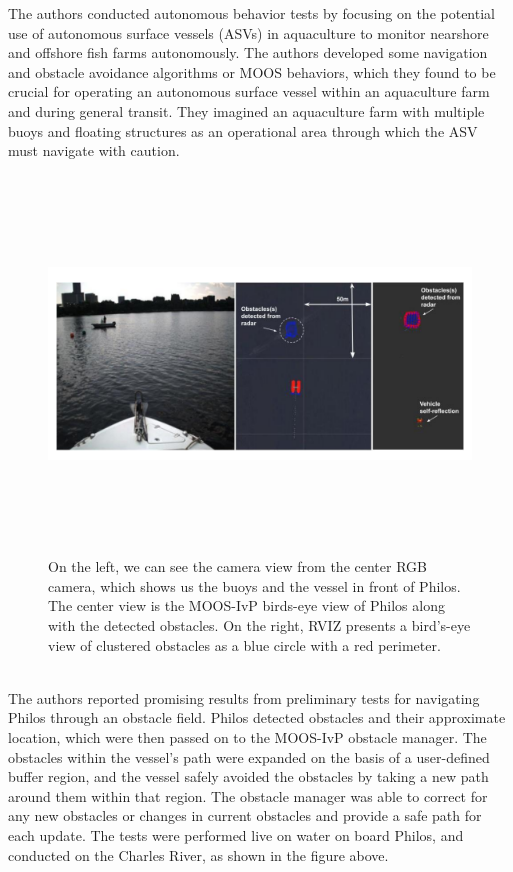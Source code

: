 The authors conducted autonomous behavior tests by focusing on the potential use of autonomous surface vessels (ASVs) in aquaculture to monitor nearshore and offshore fish farms autonomously. The authors developed some navigation and obstacle avoidance algorithms or MOOS behaviors, which they found to be crucial for operating an autonomous surface vessel within an aquaculture farm and during general transit. They imagined an aquaculture farm with multiple buoys and floating structures as an operational area through which the ASV must navigate with caution.\cite{benjamin2009overview}
\begin{figure}[H]
    \centering
    \includegraphics[width=\textwidth,height=10cm,keepaspectratio=true]{src/Images/philos_test.PNG}
    \caption{
     On the left, we can see the camera view from the center RGB camera, which shows us the buoys and the vessel in front of Philos. The center view is the MOOS-IvP birds-eye view of Philos along with the detected obstacles. On the right, RVIZ presents a bird's-eye view of clustered obstacles as a blue circle with a red perimeter.\cite{defilippo2021robowhaler}
    }
\end{figure}
\\

The authors reported promising results from preliminary tests for navigating Philos through an obstacle field. Philos detected obstacles and their approximate location, which were then passed on to the MOOS-IvP obstacle manager. The obstacles within the vessel's path were expanded on the basis of a user-defined buffer region, and the vessel safely avoided the obstacles by taking a new path around them within that region. The obstacle manager was able to correct for any new obstacles or changes in current obstacles and provide a safe path for each update. The tests were performed live on water on board Philos, and conducted on the Charles River, as shown in the figure above.\cite{defilippo2021robowhaler}
\\

